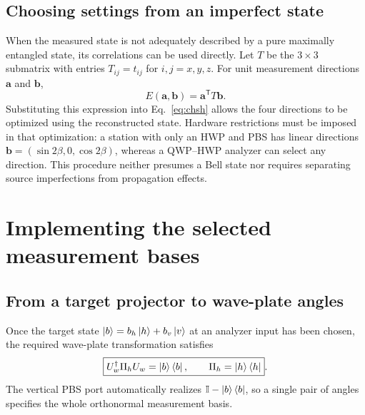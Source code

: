 \documentclass[a4paper,10pt]{article}
\newcommand{\I}{\mathbb{I}}
\begin{document}
\subsection{Choosing settings from an imperfect state}

When the measured state is not adequately described by a pure maximally
entangled state, its correlations can be used directly. Let $T$ be the
$3\times3$ submatrix with entries $T_{ij}=t_{ij}$ for $i,j=x,y,z$.
For unit measurement directions $\boldsymbol a$ and $\boldsymbol b$,
\begin{equation}
    E(\boldsymbol a,\boldsymbol b)
    =\boldsymbol a^{\mathsf T}T\boldsymbol b.
    \label{eq:measured-correlations}
\end{equation}
Substituting this expression into Eq.~\eqref{eq:chsh} allows the four
directions to be optimized using the reconstructed state. Hardware
restrictions must be imposed in that optimization: a station with only
an HWP and PBS has linear directions
$\boldsymbol b=(\sin2\beta,0,\cos2\beta)$, whereas a QWP--HWP analyzer can
select any direction. This procedure neither presumes a Bell state nor
requires separating source imperfections from propagation effects.

\section{Implementing the selected measurement bases}

\subsection{From a target projector to wave-plate angles}

Once the target state $\ket b=b_h\ket h+b_v\ket v$ at an analyzer input
has been chosen, the required wave-plate transformation satisfies
\begin{equation}
    \boxed{
        U_w^\dagger\Pi_hU_w=\ket b\bra b,
        \qquad \Pi_h=\ket h\bra h
    }.
    \label{eq:target-projector}
\end{equation}
The vertical PBS port automatically realizes
$\I-\ket b\bra b$, so a single pair of angles specifies the whole
orthonormal measurement basis.
\end{document}
